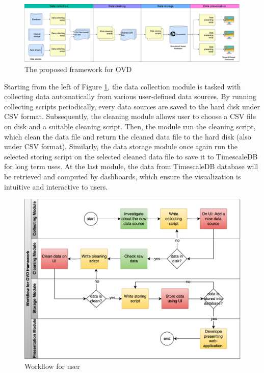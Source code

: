 \begin{figure}[H]
    \centering
    \includegraphics[width=1.0\linewidth]{studentWorkTemplate_en/figures/mt-222100012-framework-overview.drawio.png}
    \caption{The proposed framework for OVD}
    \label{fig:design:framework-overview}
\end{figure}

Starting from the left of Figure \ref{fig:design:framework-overview}, the data collection module is tasked with collecting data automatically from various user-defined data sources. By running collecting scripts periodically, every data sources are saved to the hard disk under CSV format. 
Subsequently, the cleaning module allows user to choose a CSV file on disk and a suitable cleaning script. Then, the module run the cleaning script, which clean the data file and return the cleaned data file to the hard disk (also under CSV format). 
Similarly, the data storage module once again run the selected storing script on the selected cleaned data file to save it to TimescaleDB for long term uses. 
At the last module, the data from TimescaleDB database will be retrieved and computed by dashboards, which ensure the visualization is intuitive and interactive to users.


\begin{figure}[H]
    \centering
    \includegraphics[width=0.8\linewidth]{studentWorkTemplate_en/figures/mt-222100012-workflow.drawio.png}
    \caption{Workflow for user}
    \label{fig:framework-workflow}
\end{figure}

